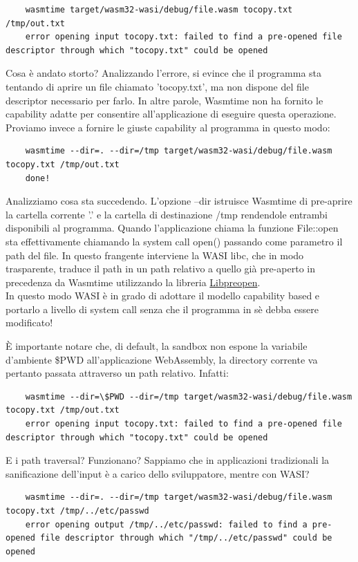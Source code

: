 \begin{lstlisting}
    wasmtime target/wasm32-wasi/debug/file.wasm tocopy.txt /tmp/out.txt
    error opening input tocopy.txt: failed to find a pre-opened file descriptor through which "tocopy.txt" could be opened
\end{lstlisting}
Cosa è andato storto? Analizzando l'errore, si evince che il programma sta tentando di aprire un file chiamato
'tocopy.txt', ma non dispone del file descriptor necessario per farlo. In altre parole, Wasmtime non ha
fornito le capability adatte per consentire all'applicazione di eseguire questa operazione.
\\
Proviamo invece a fornire le giuste capability al programma in questo modo:
\begin{lstlisting}
    wasmtime --dir=. --dir=/tmp target/wasm32-wasi/debug/file.wasm tocopy.txt /tmp/out.txt
    done!
\end{lstlisting}
Analizziamo cosa sta succedendo. L'opzione --dir istruisce Wasmtime di pre-aprire la cartella corrente '.' e la cartella
di destinazione /tmp rendendole entrambi disponibili al programma. Quando l'applicazione chiama la funzione File::open
sta effettivamente chiamando la system call open() passando come parametro il path del file. In questo frangente
interviene la WASI libc, che in modo trasparente, traduce il path in un path relativo a quello già pre-aperto in
precedenza da Wasmtime utilizzando la libreria \hyperref[sec:libpreopen]{Libpreopen}. \\In questo modo WASI è in grado
di adottare il modello capability based e portarlo a livello di system call senza che il programma in sè debba essere
modificato!

È importante notare che, di default, la sandbox non espone la variabile d'ambiente \$PWD all'applicazione WebAssembly,
la directory corrente va pertanto passata attraverso un path relativo. Infatti:
\begin{lstlisting}
    wasmtime --dir=\$PWD --dir=/tmp target/wasm32-wasi/debug/file.wasm tocopy.txt /tmp/out.txt
    error opening input tocopy.txt: failed to find a pre-opened file descriptor through which "tocopy.txt" could be opened
\end{lstlisting}

E i path traversal? Funzionano? Sappiamo che in applicazioni
tradizionali la sanificazione dell'input è a carico dello sviluppatore, mentre con WASI?

\begin{lstlisting}
    wasmtime --dir=. --dir=/tmp target/wasm32-wasi/debug/file.wasm tocopy.txt /tmp/../etc/passwd
    error opening output /tmp/../etc/passwd: failed to find a pre-opened file descriptor through which "/tmp/../etc/passwd" could be opened
\end{lstlisting}

